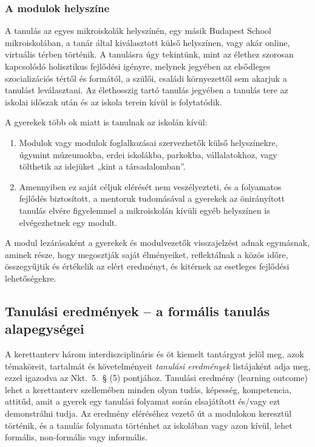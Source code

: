 \subsubsection{A modulok helyszíne}

A tanulás az egyes mikroiskolák helyszínén, egy másik Budapest School mikroiskolában, a tanár által kiválasztott külső helyszínen, vagy akár online, virtuális térben történik. A tanulásra úgy tekintünk, mint az élethez szorosan kapcsolódó holisztikus fejlődési igényre, melynek jegyében az elsődleges szocializációs tértől és formától, a szülői, családi környezettől sem akarjuk a tanulást leválasztani. Az élethosszig tartó tanulás jegyében a tanulás tere az iskolai időszak után és az iskola terein kívül is folytatódik.

A gyerekek több ok miatt is tanulnak az iskolán kívül:

\begin{enumerate}
      \item Modulok vagy modulok foglalkozásai szervezhetők külső helyszínekre, úgymint múzeumokba, erdei iskolákba, parkokba, vállalatokhoz, vagy tölthetik az idejüket „kint a társadalomban''.

      \item Amennyiben ez saját céljuk elérését nem veszélyezteti, és a folyamatos fejlődés biztosított, a mentoruk tudomásával a gyerekek az önirányított tanulás elvére figyelemmel a mikroiskolán kívüli egyéb helyszínen is elvégezhetnek egy modult.
\end{enumerate}

A modul lezárásaként a gyerekek és modulvezetők visszajelzést adnak egymásnak, aminek része, hogy megosztják saját élményeiket, reflektálnak a közös időre, összegyűjtik és értékelik az elért eredményt, és kitérnek az esetleges fejlődési lehetőségekre.

\subsection{Tanulási eredmények -- a formális tanulás alapegységei}
\label{sec:tanulasi_eredmenyek}
A kerettanterv három interdiszciplináris és öt kiemelt tantárgyat jelöl meg, azok témaköreit, tartalmát és követelményeit \emph{tanulási eredmények} listájaként adja meg, ezzel igazodva az Nkt.~5.~§ (5) pontjához. Tanulási eredmény (learning out\-come) lehet a kerettanterv szellemében minden olyan tudás, képesség, kompetencia, attitűd, amit a gyerek egy tanulási folyamat során elsajátított és/vagy ezt demonstrálni tudja. Az eredmény eléréséhez vezető út a modulokon keresztül történik, és a tanulás folyamata történhet az iskolában vagy azon kívül, lehet formális, non-formális vagy informális.

